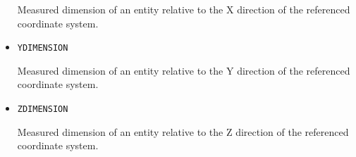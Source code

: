 \begin{itemize}
Measured dimension of an entity relative to the X direction of the referenced coordinate system.



\item \texttt{Y\textunderscore DIMENSION}  

Measured dimension of an entity relative to the Y direction of the referenced coordinate system.


\item \texttt{Z\textunderscore DIMENSION}  

Measured dimension of an entity relative to the Z direction of the referenced coordinate system.

\end{itemize}


